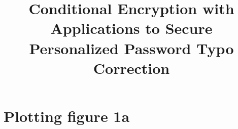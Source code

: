 \documentclass{article}
\begin{document}
	\title{Conditional Encryption with Applications to Secure Personalized Password Typo Correction}
	
	
	
	\maketitle
	
	
	\section{Plotting figure 1a}
	
	
	
	
	
	
	
	
	
	
	
	
	
	
\end{document}
